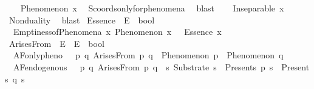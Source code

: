 \begin{isabellebody}
\ \ \isamarkupfalse%
\ {\isachardoublequoteopen}Phenomenon\ x{\isachardoublequoteclose}\ \isamarkupfalse%
\ S{}{\isacharunderscore}{\kern0pt}coords{\isacharunderscore}{\kern0pt}only{\isacharunderscore}{\kern0pt}for{\isacharunderscore}{\kern0pt}phenomena\ \isamarkupfalse%
\ blast\isanewline
\ \ \isamarkupfalse%
\ {\isachardoublequoteopen}Inseparable\ x\ {\isasymOmega}{\isachardoublequoteclose}\ \isamarkupfalse%
\ Nonduality\ \isamarkupfalse%
\ blast\isanewline
{}\isamarkupfalse%
%
\endisatagproof
{\isafoldproof}%
%
\isadelimproof
%
\endisadelimproof
%
\isadelimdocument
%
\endisadelimdocument
%
\isatagdocument
%
\isamarkuptrue%
%
\endisatagdocument
{\isafolddocument}%
%
\isadelimdocument
%
\endisadelimdocument
{}\isamarkupfalse%
\ Essence\ {\isacharcolon}{\kern0pt}{\isacharcolon}{\kern0pt}\ {\isachardoublequoteopen}E\ {\isasymRightarrow}\ bool{\isachardoublequoteclose}\isanewline
\isanewline
{}\isamarkupfalse%
\ \isanewline
\ \ Emptiness{\isacharunderscore}{\kern0pt}of{\isacharunderscore}{\kern0pt}Phenomena{\isacharcolon}{\kern0pt}\ {\isachardoublequoteopen}{\isasymforall}x{\isachardot}{\kern0pt}\ Phenomenon\ x\ {\isasymlongrightarrow}\ {\isasymnot}\ Essence\ x{\isachardoublequoteclose}%
\isadelimdocument
%
\endisadelimdocument
%
\isatagdocument
%
\isamarkuptrue%
%
\endisatagdocument
{\isafolddocument}%
%
\isadelimdocument
%
\endisadelimdocument
{}\isamarkupfalse%
\ ArisesFrom\ {\isacharcolon}{\kern0pt}{\isacharcolon}{\kern0pt}\ {\isachardoublequoteopen}E\ {\isasymRightarrow}\ E\ {\isasymRightarrow}\ bool{\isachardoublequoteclose}\ \ \ \isanewline
\isanewline
{}\isamarkupfalse%
\ \isanewline
\ \ AF{\isacharunderscore}{\kern0pt}only{\isacharunderscore}{\kern0pt}pheno{\isacharcolon}{\kern0pt}\ \ \ {\isachardoublequoteopen}{\isasymforall}p\ q{\isachardot}{\kern0pt}\ ArisesFrom\ p\ q\ {\isasymlongrightarrow}\ Phenomenon\ p\ {\isasymand}\ Phenomenon\ q{\isachardoublequoteclose}\ \isanewline
\ \ AF{\isacharunderscore}{\kern0pt}endogenous{\isacharcolon}{\kern0pt}\ \ \ {\isachardoublequoteopen}{\isasymforall}p\ q{\isachardot}{\kern0pt}\ ArisesFrom\ p\ q\ {\isasymlongrightarrow}\ {\isacharparenleft}{\kern0pt}{\isasymexists}s{\isachardot}{\kern0pt}\ Substrate\ s\ {\isasymand}\ Presents\ p\ s\ {\isasymand}\ Presents\ q\ s{\isacharparenright}{\kern0pt}{\isachardoublequoteclose}\ \isanewline

\end{isabellebody}
